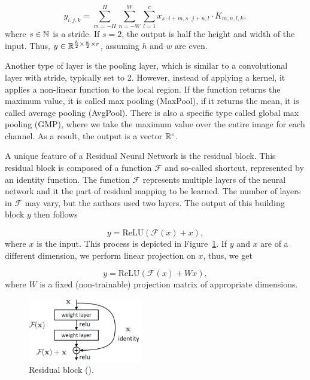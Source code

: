 \begin{equation*}
	y_{i,j,k} = \sum_{m = -H}^{H} \sum_{n = -W}^{W} \sum_{l=1}^{c} x_{s \cdot i+m,s \cdot j+n,l} \cdot K_{m,n,l,k},
\end{equation*}
where $s \in \mathbb{N}$ is a stride. If $s=2$, the output is half the height and width of the input. Thus, $y \in \mathbb{R}^{\frac{h}{2} \times \frac{w}{2} \times r}$, assuming $h$ and $w$ are even.

Another type of layer is the pooling layer, which is similar to a convolutional layer with stride, typically set to 2. However, instead of applying a kernel, it applies a non-linear function to the local region. If the function returns the maximum value, it is called max pooling (MaxPool), if it returns the mean, it is called average pooling (AvgPool). There is also a specific type called global max pooling (GMP), where we take the maximum value over the entire image for each channel. As a result, the output is a vector $\mathbb{R}^c$.

A unique feature of a Residual Neural Network is the residual block. This residual block is composed of a function $\mathcal{F}$ and so-called shortcut, represented by an identity function. The function $\mathcal{F}$ represents multiple layers of the neural network and it the part of residual mapping to be learned. The number of layers in $\mathcal{F}$ may vary, but the authors used two layers. The output of this building block $y$ then follows

\begin{equation}
	y = \text{ReLU} ( \mathcal{F}(x) + x ),
	\label{residual_block_identity}
\end{equation}
where $x$ is the input. This process is depicted in Figure~\ref{fig:residual_block}. If $y$ and $x$ are of a different dimension, we perform linear projection on $x$, thus, we get

\begin{equation}
	y = \text{ReLU} ( \mathcal{F}(x) + W x ),
	\label{residual_block_projection}
\end{equation}
where $W$ is a fixed (non-trainable) projection matrix of appropriate dimensions.

\begin{figure}[h!]
	\centering
	\includegraphics[width=0.44\textwidth]{../img/residual_block.png}
	\caption{Residual block (\cite{He2016}).}
	\label{fig:residual_block}
\end{figure}

